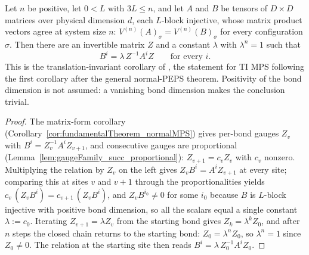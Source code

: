 \begin{corollary}%
    \label{cor:fundamentalTheorem_normalMPS_translationInvariant}
    \leanok
    Let $n$ be positive, let $0 < L$ with $3L \le n$, and let $A$ and $B$ be
    tensors of $D \times D$ matrices over physical dimension $d$, each
    $L$-block injective, whose matrix product vectors agree at system size
    $n$: $V^{(n)}(A)_\sigma = V^{(n)}(B)_\sigma$ for every configuration
    $\sigma$.  Then there are an invertible matrix $Z$ and a constant
    $\lambda$ with $\lambda^n = 1$ such that
    \[
        B^i = \lambda\, Z^{-1} A^i Z \qquad\text{for every } i .
    \]
    This is the translation-invariant corollary of
    \cite[Section~3]{Molnar2018NormalPEPS}, the statement for TI MPS
    following the first corollary after the general normal-PEPS theorem.
    Positivity of the bond dimension is not assumed: a vanishing bond
    dimension makes the conclusion trivial.
\end{corollary}
\begin{proof}\leanok
    The matrix-form corollary
    (Corollary~\ref{cor:fundamentalTheorem_normalMPS}) gives per-bond gauges
    $Z_v$ with $B^i = Z_v^{-1} A^i Z_{v+1}$, and consecutive gauges are
    proportional (Lemma~\ref{lem:gaugeFamily_succ_proportional}):
    $Z_{v+1} = c_v Z_v$ with $c_v$ nonzero.  Multiplying the relation by
    $Z_v$ on the left gives $Z_v B^i = A^i Z_{v+1}$ at every site; comparing
    this at sites $v$ and $v+1$ through the proportionalities yields
    $c_v\,(Z_v B^i) = c_{v+1}\,(Z_v B^i)$, and $Z_v B^{i_0} \neq 0$ for some
    $i_0$ because $B$ is $L$-block injective with positive bond dimension,
    so all the scalars equal a single constant $\lambda := c_0$.  Iterating
    $Z_{v+1} = \lambda Z_v$ from the starting bond gives
    $Z_k = \lambda^k Z_0$, and after $n$ steps the closed chain returns to
    the starting bond: $Z_0 = \lambda^n Z_0$, so $\lambda^n = 1$ since
    $Z_0 \neq 0$.  The relation at the starting site then reads
    $B^i = \lambda\, Z_0^{-1} A^i Z_0$.
\end{proof}

